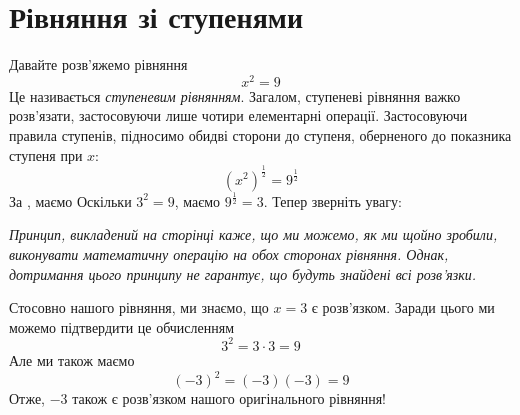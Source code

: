 \documentclass[english,hidelinks,xetex, 11 pt, class=report,crop=false]{standalone}
\begin{document}
\newpage
{}
\section{Рівняння зі ступенями}
Давайте розв'яжемо рівняння
\[ x^2=9 \]
Це називається \textit{ступеневим рівнянням}. Загалом, ступеневі рівняння важко розв'язати, застосовуючи лише чотири елементарні операції. Застосовуючи правила ступенів, підносимо обидві сторони до ступеня, оберненого до показника ступеня при $ x $:
\[ \left(x^2\right)^\frac{1}{2}=9^\frac{1}{2} \]
За , маємо
Оскільки $ 3^2=9 $, маємо $ 9^\frac{1}{2}=3 $. Тепер зверніть увагу: \vsk

\textit{Принцип, викладений на сторінці \pageref{principle} каже, що ми можемо, як ми щойно зробили, виконувати математичну операцію на обох сторонах рівняння. Однак, дотримання цього принципу не гарантує, що будуть знайдені всі розв'язки.} \\ \vsk

Стосовно нашого рівняння, ми знаємо, що $ {x=3} $ є розв'язком. Заради цього ми можемо підтвердити це обчисленням
\[ 3^2=3\cdot3=9 \]
Але ми також маємо
\[ (-3)^2=(-3)(-3)=9 \]
Отже, $ -3 $ також є розв'язком нашого оригінального рівняння!
\end{document}
